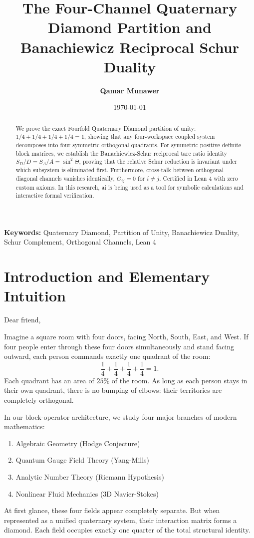 \documentclass[11pt,a4paper]{article}
\title{\textbf{The Four-Channel Quaternary Diamond Partition and Banachiewicz Reciprocal Schur Duality}}
\author{\textbf{Qamar Munawer}}
\date{\today}
\theoremstyle{definition}
\begin{document}
\maketitle

\begin{abstract}
We prove the exact Fourfold Quaternary Diamond partition of unity: $1/4 + 1/4 + 1/4 + 1/4 = 1$, showing that any four-workspace coupled system decomposes into four symmetric orthogonal quadrants. For symmetric positive definite block matrices, we establish the Banachiewicz-Schur reciprocal tare ratio identity $S_D / D = S_A / A = \sin^2 \Theta$, proving that the relative Schur reduction is invariant under which subsystem is eliminated first. Furthermore, cross-talk between orthogonal diagonal channels vanishes identically, $G_{ij} = 0$ for $i \neq j$. Certified in Lean 4 with zero custom axioms. In this research, ai is being used as a tool for symbolic calculations and interactive formal verification.
\end{abstract}

\vspace{1em}
\noindent\textbf{Keywords:} Quaternary Diamond, Partition of Unity, Banachiewicz Duality, Schur Complement, Orthogonal Channels, Lean 4

\section{Introduction and Elementary Intuition}

Dear friend,

Imagine a square room with four doors, facing North, South, East, and West. If four people enter through these four doors simultaneously and stand facing outward, each person commands exactly one quadrant of the room:
\begin{equation}
\frac{1}{4} + \frac{1}{4} + \frac{1}{4} + \frac{1}{4} = 1.
\end{equation}
Each quadrant has an area of $25\%$ of the room. As long as each person stays in their own quadrant, there is no bumping of elbows: their territories are completely orthogonal.

In our block-operator architecture, we study four major branches of modern mathematics:
\begin{enumerate}
    \item Algebraic Geometry (Hodge Conjecture)
    \item Quantum Gauge Field Theory (Yang-Mills)
    \item Analytic Number Theory (Riemann Hypothesis)
    \item Nonlinear Fluid Mechanics (3D Navier-Stokes)
\end{enumerate}
At first glance, these four fields appear completely separate. But when represented as a unified quaternary system, their interaction matrix forms a diamond. Each field occupies exactly one quarter of the total structural identity.
\end{document}
